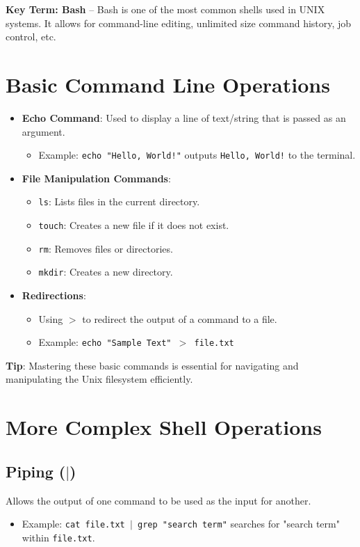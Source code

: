 \documentclass[12pt]{article}
\begin{document}
\noindent \textbf{Key Term: Bash} – Bash is one of the most common shells used in UNIX systems. It allows for command-line editing, unlimited size command history, job control, etc.

\section{Basic Command Line Operations}

\begin{itemize}
    \item \textbf{Echo Command}: Used to display a line of text/string that is passed as an argument.
    \begin{itemize}
        \item Example: \texttt{echo "Hello, World!"} outputs \texttt{Hello, World!} to the terminal.
    \end{itemize}
    
    \item \textbf{File Manipulation Commands}:
    \begin{itemize}
        \item \texttt{ls}: Lists files in the current directory.
        \item \texttt{touch}: Creates a new file if it does not exist.
        \item \texttt{rm}: Removes files or directories.
        \item \texttt{mkdir}: Creates a new directory.
    \end{itemize}
    
    \item \textbf{Redirections}:
    \begin{itemize}
        \item Using \texttt{$>$} to redirect the output of a command to a file.
        \item Example: \texttt{echo "Sample Text" $>$ file.txt}
    \end{itemize}
\end{itemize}

\noindent \textbf{Tip}: Mastering these basic commands is essential for navigating and manipulating the Unix filesystem efficiently.

\section{More Complex Shell Operations}

\subsection{Piping (\texttt{$|$})}
Allows the output of one command to be used as the input for another.
\begin{itemize}
    \item Example: \texttt{cat file.txt $|$ grep "search term"} searches for "search term" within \texttt{file.txt}.
\end{itemize}
\end{document}
